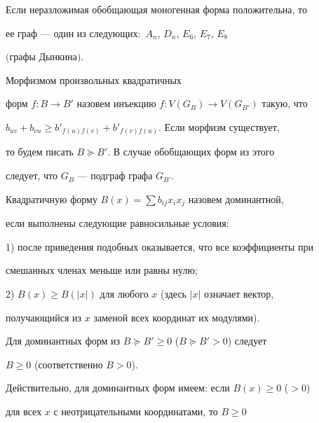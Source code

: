  


\begin{thm} 


Если неразложимая обобщающая моногенная форма положительна, то 


ее граф --- один из следующих\/${:}$ $A_n$, $D_n$, $E_6$, $E_7$, $E_8$ 


$($графы Дынкина$)$. 


\end{thm} 


 


\begin{pf} 


Морфизмом произвольных квадратичных 


форм $f:B\to B'$ назовем инъекцию $f:V(G_B)\to V(G_{B'})$ такую, что 


$b_{uv}+b_{vu}\ge b'_{f(u)f(v)}+b'_{f(v)f(u)}$. Если морфизм существует, 


то будем писать $B\succeq B'$. В случае обобщающих форм из этого 


следует, что $G_B$ --- подграф графа $G_{B'}$. 


 


Квадратичную форму $B(x)=\sum b_{ij}x_i x_j$ назовем доминантной, 


если выполнены следующие равносильные условия: 


 


1) после приведения подобных оказывается, что все коэффициенты при 


смешанных членах меньше или равны нулю; 


 


2) $B(x)\ge B(|x|)$ для любого $x$ (здесь $|x|$ означает вектор, 


получающийся из $x$ заменой всех координат их модулями). 


 


Для доминантных форм из $B\succeq B'\ge0$ ($B\succeq B'>0$) следует 


$B\ge0$ (соответственно $B>0$). 


 


Действительно, для доминантных форм имеем: если $B(x)\ge0$ ($>0$) 


для всех $x$ с неотрицательными координатами, то $B\ge0$ 



\end{pf}
